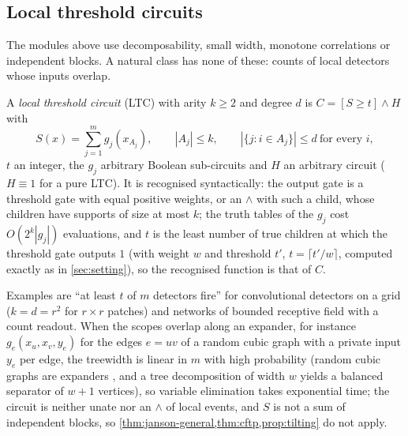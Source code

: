 \subsection{Local threshold circuits}\label{sec:local}

The modules above use decomposability, small width, monotone correlations or
independent blocks. A natural class has none of these: counts of local
detectors whose inputs overlap.

\begin{definition}\label{def:ltc}
A \emph{local threshold circuit} (LTC) with arity $k\ge2$ and degree $d$ is
$C=[S\ge t]\wedge H$ with
\[
S(x)=\sum_{j=1}^mg_j(x_{A_j}),\qquad |A_j|\le k,\qquad
|\{j:i\in A_j\}|\le d\ \text{for every }i,
\]
$t$ an integer, the $g_j$ arbitrary Boolean sub-circuits and $H$ an arbitrary
circuit ($H\equiv1$ for a pure LTC). It is recognised syntactically: the output
gate is a threshold gate with equal positive weights, or an $\wedge$ with such a child,
whose children have supports of size at most $k$; the truth tables of the $g_j$ cost
$O(2^k|g_j|)$ evaluations, and $t$ is the least number of true children at which the
threshold gate outputs $1$ (with weight $w$ and threshold $t'$, $t=\lceil t'/w\rceil$,
computed exactly as in \cref{sec:setting}), so the recognised function is that of $C$.
\end{definition}

Examples are ``at least $t$ of $m$ detectors fire'' for convolutional detectors
on a grid ($k=d=r^2$ for $r\times r$ patches) and networks of bounded receptive
field with a count readout. When the scopes overlap along an expander, for
instance $g_e(x_u,x_v,y_e)$ for the edges $e=uv$ of a random cubic graph with a
private input $y_e$ per edge, the treewidth is linear in $m$ with high probability
(random cubic graphs are expanders \cite{friedman2008}, and a tree decomposition of
width $w$ yields a balanced separator of $w+1$ vertices), so variable elimination takes
exponential time; the circuit is neither unate nor an $\wedge$ of local events, and $S$
is not a sum of independent blocks, so
\cref{thm:janson-general,thm:cftp,prop:tilting} do not apply.

